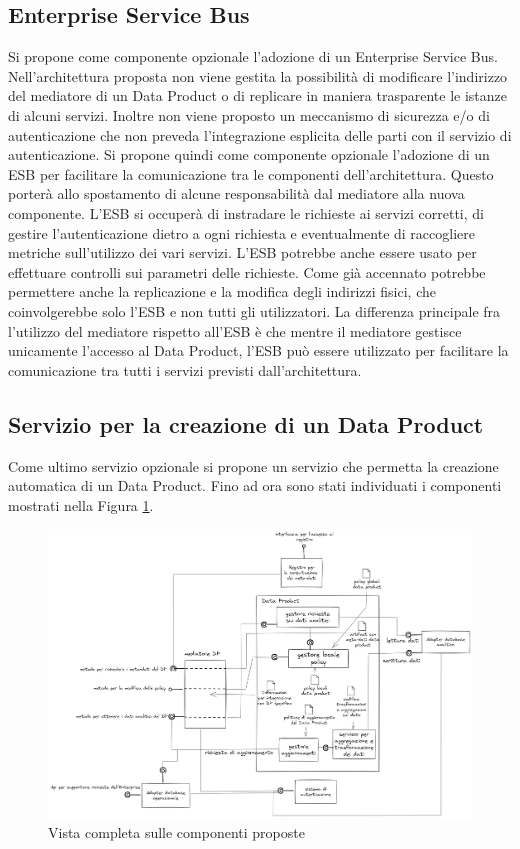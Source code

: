 \documentclass[12pt]{report}
\begin{document}
\subsection{Enterprise Service Bus}
Si propone come componente opzionale l'adozione di un Enterprise Service Bus.
Nell'architettura proposta non viene gestita la possibilità di modificare l'indirizzo del mediatore di un Data Product o di replicare in maniera trasparente le istanze di alcuni servizi.
Inoltre non viene proposto un meccanismo di sicurezza e/o di autenticazione che non preveda l'integrazione esplicita delle parti con il servizio di autenticazione.
Si propone quindi come componente opzionale l'adozione di un ESB per facilitare la comunicazione tra le componenti dell'architettura.
Questo porterà allo spostamento di alcune responsabilità dal mediatore alla nuova componente.
L'ESB si occuperà di instradare le richieste ai servizi corretti, di gestire l'autenticazione dietro a ogni richiesta e  eventualmente di raccogliere metriche sull'utilizzo dei vari servizi.
L'ESB potrebbe anche essere usato per effettuare controlli sui parametri delle richieste.
Come già accennato potrebbe permettere anche la replicazione e la modifica degli indirizzi fisici, che coinvolgerebbe solo l'ESB e non tutti gli utilizzatori.
La differenza principale fra l'utilizzo del mediatore rispetto all'ESB è che mentre il mediatore gestisce unicamente l'accesso al Data Product, l'ESB può essere utilizzato per facilitare la comunicazione tra tutti i servizi previsti dall'architettura.

\subsection{Servizio per la creazione di un Data Product}
Come ultimo servizio opzionale si propone un servizio che permetta la creazione automatica di un Data Product.
Fino ad ora sono stati individuati i componenti mostrati nella Figura \ref{fig:architettura completa}.
\begin{figure}[H]
    \centering
    \includegraphics[width=\linewidth]{immagini/disegno completo architettura 2024-03-12 18.03.16.excalidraw.png}
    \caption{Vista completa sulle componenti proposte}
    \label{fig:architettura completa}
\end{figure}
\end{document}
